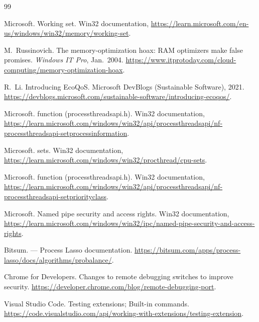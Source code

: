 \begin{thebibliography}{99}

Microsoft.
\newblock Working set.
\newblock Win32 documentation, \url{https://learn.microsoft.com/en-us/windows/win32/memory/working-set}.


M.~Russinovich.
\newblock The memory-optimization hoax: {RAM} optimizers make false promises.
\newblock \emph{Windows IT Pro}, Jan.\ 2004.
\newblock \url{https://www.itprotoday.com/cloud-computing/memory-optimization-hoax}.


R.~Li.
\newblock Introducing {EcoQoS}.
\newblock Microsoft DevBlogs (Sustainable Software), 2021.
\newblock \url{https://devblogs.microsoft.com/sustainable-software/introducing-ecoqos/}.


Microsoft.
 function (processthreadsapi.h).
\newblock Win32 documentation, \url{https://learn.microsoft.com/windows/win32/api/processthreadsapi/nf-processthreadsapi-setprocessinformation}.


Microsoft.
 sets.
\newblock Win32 documentation, \url{https://learn.microsoft.com/windows/win32/procthread/cpu-sets}.


Microsoft.
 function (processthreadsapi.h).
\newblock Win32 documentation, \url{https://learn.microsoft.com/windows/win32/api/processthreadsapi/nf-processthreadsapi-setpriorityclass}.


Microsoft.
\newblock Named pipe security and access rights.
\newblock Win32 documentation, \url{https://learn.microsoft.com/windows/win32/ipc/named-pipe-security-and-access-rights}.


Bitsum.
 --- Process Lasso documentation.
\newblock \url{https://bitsum.com/apps/process-lasso/docs/algorithms/probalance/}.


Chrome for Developers.
\newblock Changes to remote debugging switches to improve security.
\newblock \url{https://developer.chrome.com/blog/remote-debugging-port}.


Visual Studio Code.
\newblock Testing extensions; Built-in commands.
\newblock \url{https://code.visualstudio.com/api/working-with-extensions/testing-extension}.

\end{thebibliography}
